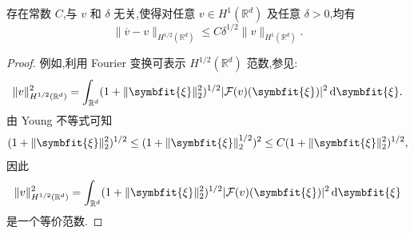 \begin{lemma}
\label{lem:gaussian-filter-Hhalf}
存在常数 $C$,与 $v$ 和 $\delta$ 无关,使得对任意 $v\in H^1(\mathbb{R}^d)$ 及任意 $\delta>0$,均有
\begin{equation}\label{eq:gaussian-filter-Hhalf-estimate}
 \|\overline{v}-v\|_{H^{1/2}(\mathbb{R}^d)}
  \le C\delta^{1/2}\|v\|_{H^1(\mathbb{R}^d)}.
\end{equation}
\end{lemma}
\begin{proof}
例如,利用 Fourier 变换可表示 $H^{1/2}(\mathbb{R}^d)$ 范数,参见\textcite[Section~5.8.5, Theorem~8]{Evans2010}:
\[
 \|v\|_{H^{1/2}(\mathbb{R}^d)}^2
  =\int_{\mathbb{R}^d}
     (1+\|\symbfit{\xi}\|_2^2)^{1/2}
     |\mathcal{F}(v)(\symbfit{\xi})|^2\,\mathrm{d}\symbfit{\xi}.
\]
由 Young 不等式可知
\[
  (1+\|\symbfit{\xi}\|_2^2)^{1/2}
  \le (1+\|\symbfit{\xi}\|_2^{1/2})^2
  \le C(1+\|\symbfit{\xi}\|_2^2)^{1/2},
\]
因此
\[
 \|v\|_{H^{1/2}(\mathbb{R}^d)}^2
  =\int_{\mathbb{R}^d}
     (1+\|\symbfit{\xi}\|_2^2)^{1/2}
     |\mathcal{F}(v)(\symbfit{\xi})|^2\,\mathrm{d}\symbfit{\xi}
\]
是一个等价范数.


\end{proof}
